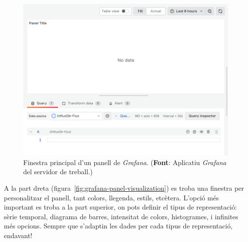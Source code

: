 \begin{figure}[htbp]
    \centerline{\includegraphics[width=\textwidth]{figures/grafana-main-panel}}
    \captionsetup{justification=centering}
    \caption[Finestra principal d'un panell de \textit{Grafana}.]{Finestra principal d'un panell de \textit{Grafana}. (\textbf{Font}: Aplicatiu \textit{Grafana} del servidor de treball.)}\label{fig:grafana-main-panel}
\end{figure}

\clearpage

\noindent
A la part dreta (figura~\ref{fig:grafana-panel-visualization}) es troba una finestra per personalitzar el panell, tant colors, llegenda, estils, etcètera.
L'opció més important es troba a la part superior, on pots definir el tipus de representació: sèrie temporal, diagrama de barres, intensitat de colors, histogrames, i infinites més opcions.
Sempre que s'adaptin les dades per cada tipus de representació, endavant!

